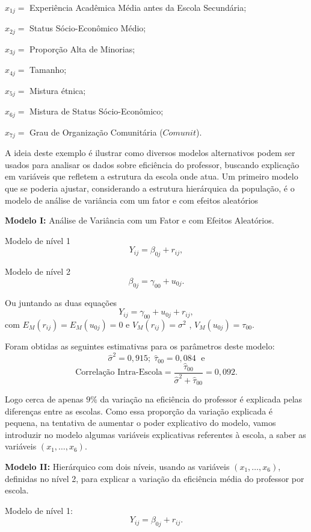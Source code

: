 \documentclass[]{book}
\numberwithin{example}{chapter}
\numberwithin{remark}{chapter}
\numberwithin{definition}{chapter}
\begin{document}
\(x_{1j}=\) Experiência Acadêmica Média antes da Escola Secundária;

\(x_{2j}=\) Status Sócio-Econômico Médio;

\(x_{3j}=\) Proporção Alta de Minorias;

\(x_{4j}=\) Tamanho;

\(x_{5j}=\) Mistura étnica;

\(x_{6j}=\) Mistura de Status Sócio-Econômico;

\(x_{7j}=\) Grau de Organização Comunitária (\(Comunit\)).

A ideia deste exemplo é ilustrar como diversos modelos alternativos
podem ser usados para analisar os dados sobre eficiência do professor,
buscando explicação em variáveis que refletem a estrutura da escola onde
atua. Um primeiro modelo que se poderia ajustar, considerando a
estrutura hierárquica da população, é o modelo de análise de variância
com um fator e com efeitos aleatórios

\textbf{Modelo I: }Análise de Variância com um Fator e com Efeitos
Aleatórios.

Modelo de nível 1 \[
Y_{ij}=\beta _{0j}+r_{ij},
\]

Modelo de nível 2 \[
\beta _{0j}=\gamma _{00}+u_{0j}.
\]

Ou juntando as duas equações \[
Y_{ij}=\gamma _{00}+u_{0j}+r_{ij},
\] com \(E_{M}\left( r_{ij}\right) =E_{M}\left( u_{0j}\right) =0\) e
\(V_{M}\left( r_{ij}\right) =\sigma ^{2}\) ,
\(V_{M}\left( u_{0j}\right) =\tau _{00}\).

Foram obtidas as seguintes estimativas para os parâmetros deste modelo:
\[
\hat{\sigma}^{2}=0,915;\;\hat{\tau}_{00}=0,084\;\mbox{ e}
\] \[
\mbox{Correlação Intra-Escola}=\frac{\hat{\tau}_{00}}{\hat{
\sigma}^{2}+\hat{\tau}_{00}}=0,092.
\]

Logo cerca de apenas \(9\%\) da variação na eficiência do professor é
explicada pelas diferenças entre as escolas. Como essa proporção da
variação explicada é pequena, na tentativa de aumentar o poder
explicativo do modelo, vamos introduzir no modelo algumas variáveis
explicativas referentes à escola, a saber as variáveis
\(\left( x_{1},\ldots ,x_{6}\right)\).

\textbf{Modelo II:} Hierárquico com dois níveis, usando as variáveis
\(\left( x_{1},\ldots ,x_{6}\right)\), definidas no nível 2, para
explicar a variação da eficiência média do professor por escola.

Modelo de nível 1: \[
Y_{ij}=\beta _{0j}+r_{ij}.
\]
\end{document}
